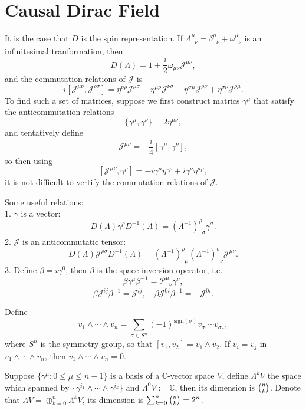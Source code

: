 \documentclass[10pt]{article}
\begin{document}
\section{Causal Dirac Field}
It is the case that $D$ is the spin representation. If $\Lambda^\mu_{\phantom{\mu}\nu}=\delta^\mu_{\phantom{\mu}\nu}+\omega^\mu_{\phantom{\mu}\nu}$ is an infinitesimal tranformation, then
\[
	D(\Lambda)=1+\frac{i}{2}\omega_{\mu\nu} \mathscr{J}^{\mu\nu},
\]
and the commutation relations of $\mathscr{J}$ is
\[
	i\left[\mathscr{J}^{\mu\nu},\mathscr{J}^{\rho \sigma}\right]=
	\eta^{\nu\rho}\mathscr{J}^{\mu \sigma}-
	\eta^{\mu \rho}\mathscr{J}^{\nu \sigma}-
	\eta^{\sigma\mu}\mathscr{J}^{\rho \nu}+
	\eta^{\sigma\nu}\mathscr{J}^{\rho \mu}.
\]
To find such a set of matrices, suppose we first construct matrics $\gamma^\mu$ that satisfy the anticommutation relations
\[
	\{\gamma^\mu,\gamma^\nu\}=2\eta^{\mu\nu},
\]
and tentatively define
\[
	\mathscr{J}^{\mu\nu}=-\frac{i}{4}[\gamma^\mu,\gamma^\nu],
\]
so then using
\[
	[\mathscr{J}^{\mu\nu},\gamma^\rho]=-i\gamma^\mu \eta^{\nu\rho}+i\gamma^\nu \eta^{\mu\rho},
\]
it is not difficult to vertify the commutation relations of $\mathscr{J}$.

Some useful relations:\\
1. $\gamma$ is a vector:
\[
	D(\Lambda)\gamma^\rho D^{-1}(\Lambda)=(\Lambda^{-1})^\rho_{\phantom{\rho}\sigma}\gamma^\sigma.
\]
2. $\mathscr{J}$ is an anticommutatic tensor:
\[
	D(\Lambda)\mathscr{J}^{\rho\sigma} D^{-1}(\Lambda)=(\Lambda^{-1})^\rho_{\phantom{\rho}\mu}(\Lambda^{-1})^\sigma_{\phantom{\sigma}\nu}\mathscr{J}^{\mu\nu}.
\]
3. Define $\beta=i\gamma^0$, then $\beta$ is the space-inversion operator, i.e.
\[
	\beta \gamma^\mu \beta^{-1}=\mathscr{P}^\mu_{\phantom{\mu}\nu}\gamma^\nu,
\]
\[
	\beta \mathscr{J}^{ij} \beta^{-1}=\mathscr{J}^{ij}, \quad \beta \mathscr{J}^{0i} \beta^{-1}=-\mathscr{J}^{0i}.
\]

Define
\[
	v_1\wedge \cdots \wedge v_n=\sum_{\sigma\in S^n}(-1)^{\mathrm{sign}(\sigma)}v_{\sigma_1}\cdots v_{\sigma_n},
\]
where $S^n$ is the symmetry group, so that $[v_1,v_2]=v_1\wedge v_2$. If $v_i=v_j$ in $v_1\wedge \cdots \wedge v_n$, then $v_1\wedge \cdots \wedge v_n=0$.

Suppose $\{\gamma^\mu: 0 \leq \mu \leq n-1\}$ is a basis of a $\mathbb{C}$-vector space $V$, define $\Lambda^kV$ the space which spanned by $\{\gamma^{i_1}\wedge \cdots \wedge \gamma^{i_k}\}$ and $\Lambda^0V:=\mathbb{C}$, then its dimension is $\tbinom{n}{k}$. Denote that $\Lambda V=\oplus_{k=0}^n \Lambda^kV$, its dimension is $\sum_{k=0}^{n}\tbinom{n}{k}=2^{n}$.
\end{document}
